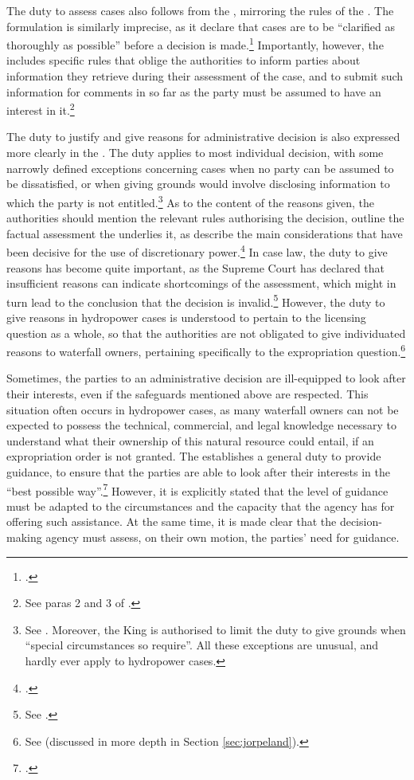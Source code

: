 The duty to assess cases also follows from the \cite{paa67}, mirroring the rules of the \cite{ea59}. The formulation is similarly imprecise, as it declare that cases are to be ``clarified as thoroughly as possible'' before a decision is made.\footcite[17]{paa67} Importantly, however, the \cite{paa67} includes specific rules that oblige the authorities to inform parties about information they retrieve during their assessment of the case, and to submit such information for comments in so far as the party must be assumed to have an interest in it.\footnote{See paras 2 and 3 of \cite[17]{paa67}.}

The duty to justify and give reasons for administrative decision is also expressed more clearly in the \cite{paa67}. The duty applies to most individual decision, with some narrowly defined exceptions concerning cases when no party can be assumed to be dissatisfied, or when giving grounds would involve disclosing information to which the party is not entitled.\footnote{See \cite[24]{paa67}. Moreover, the King is authorised to limit the duty to give grounds when ``special circumstances so require''. All these exceptions are unusual, and hardly ever apply to hydropower cases.} As to the content of the reasons given, the authorities should mention the relevant rules authorising the decision, outline the factual assessment the underlies it, as describe the main considerations that have been decisive for the use of discretionary power.\footcite[25]{paa67} In case law, the duty to give reasons has become quite important, as the Supreme Court has declared that insufficient reasons can indicate shortcomings of the assessment, which might in turn lead to the conclusion that the decision is invalid.\footnote{See \cite{isene81,hauge00}.} However, the duty to give reasons in hydropower cases is understood to pertain to the licensing question as a whole, so that the authorities are not obligated to give individuated reasons to waterfall owners, pertaining specifically to the expropriation question.\footnote{See \cite{sauda09,jorpeland11} (discussed in more depth in Section \ref{sec:jorpeland}).}

Sometimes, the parties to an administrative decision are ill-equipped to look after their interests, even if the safeguards mentioned above are respected. This situation often occurs in hydropower cases, as many waterfall owners can not be expected to possess the technical, commercial, and legal knowledge necessary to understand what their ownership of this natural resource could entail, if an expropriation order is not granted. The \cite{paa67} establishes a general duty to provide guidance, to ensure that the parties are able to look after their interests in the ``best possible way''.\footcite[11]{paa67} However, it is explicitly stated that the level of guidance must be adapted to the circumstances and the capacity that the agency has for offering such assistance. At the same time, it is made clear that  the decision-making agency must assess, on their own motion, the parties' need for guidance.

